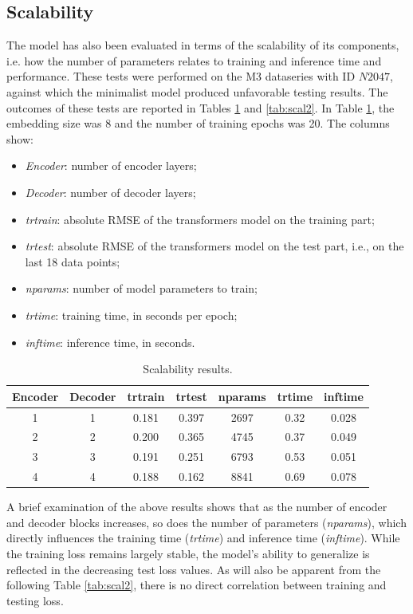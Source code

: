 \documentclass[algorithms,article,submit,pdftex,moreauthors]{Definitions/mdpi}
\begin{document}
{\subsection{Scalability}
The model has also been evaluated in terms of the scalability of its components, i.e. how the number of parameters relates to training and inference time and performance.
These tests were performed on the M3 dataseries with ID $N2047$, against which the minimalist model produced unfavorable testing results. The outcomes of these tests are reported in Tables \ref{tab:scal1} and \ref{tab:scal2}. In Table \ref{tab:scal1}, the embedding size was 8 and the number of training epochs was 20. The columns show:
\begin{itemize}
	\item {\it Encoder}: number of encoder layers;
	\item {\it Decoder}: number of decoder layers;
	\item {\it trtrain}: absolute RMSE of the transformers model on the training part;
	\item {\it trtest}: absolute RMSE of the transformers model on the test part, i.e., on the last 18 data points;
	\item {\it nparams}: number of model parameters to train;
	\item {\it trtime}: training time, in seconds per epoch;
	\item {\it inftime}: inference time, in seconds.
\end{itemize}

\begin{table}[H]
	\caption{Scalability results.}
	\label{tab:scal1}
	\centering
	\begin{tabular}{cc | ccccc}
		Encoder & Decoder & trtrain & trtest & nparams & trtime & inftime \\
		\toprule
		1 & 1 & 0.181 & 0.397 & 2697 & 0.32 & 0.028 \\
		2 & 2 & 0.200 & 0.365 & 4745 & 0.37 & 0.049 \\
		3 & 3 & 0.191 & 0.251 & 6793 & 0.53 & 0.051 \\
		4 & 4 & 0.188 & 0.162 & 8841 & 0.69 & 0.078 \\
		\bottomrule
	\end{tabular}
\end{table}

A brief examination of the above results shows that as the number of encoder and decoder blocks increases, so does the number of parameters (\textit{nparams}), which directly influences the training time (\textit{trtime}) and inference time (\textit{inftime}). While the training loss remains largely stable, the model’s ability to generalize is reflected in the decreasing test loss values. As will also be apparent from the following Table \ref{tab:scal2}, there is no direct correlation between training and testing loss.

}
\end{document}
